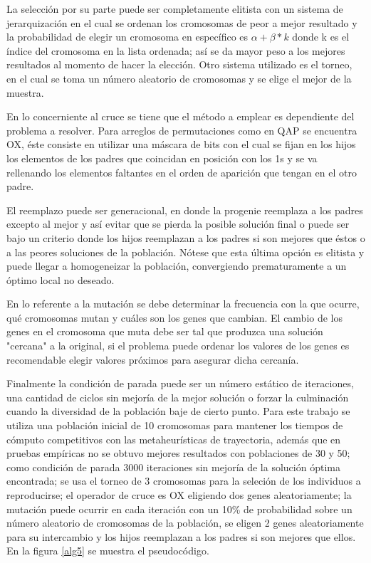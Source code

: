 \documentclass{ci5652}
\begin{document}
La selección por su parte puede ser completamente elitista con un sistema de jerarquización en el cual se ordenan los cromosomas de peor a mejor resultado y la probabilidad de elegir un cromosoma en específico es $\alpha+\beta*k$ donde k es el índice del cromosoma en la lista ordenada; así se da mayor peso a los mejores resultados al momento de hacer la elección. Otro sistema utilizado es el torneo, en el cual se toma un número aleatorio de cromosomas y se elige el mejor de la muestra.

En lo concerniente al cruce se tiene que el método a emplear es dependiente del problema a resolver. Para arreglos de permutaciones como en QAP se encuentra OX, éste consiste en utilizar una máscara de bits con el cual se fijan en los hijos los elementos de los padres que coincidan en posición con los 1s y se va rellenando los elementos faltantes en el orden de aparición que tengan en el otro padre.

El reemplazo puede ser generacional, en donde la progenie reemplaza a los padres excepto al mejor y así evitar que se pierda la posible solución final o puede ser bajo un criterio donde los hijos reemplazan a los padres si son mejores que éstos o a las peores soluciones de la población. Nótese que esta última opción es elitista y puede llegar a homogeneizar la población, convergiendo prematuramente a un óptimo local no deseado.

En lo referente a la mutación se debe determinar la frecuencia con la que ocurre, qué cromosomas mutan y cuáles son los genes que cambian. El cambio de los genes en el cromosoma que muta debe ser tal que produzca una solución "cercana" a la original, si el problema puede ordenar los valores de los genes es recomendable elegir valores próximos para asegurar dicha cercanía.

Finalmente la condición de parada puede ser un número estático de iteraciones, una cantidad de ciclos sin mejoría de la mejor solución o forzar la culminación cuando la diversidad de la población baje de cierto punto. Para este trabajo se utiliza una población inicial de 10 cromosomas para mantener los tiempos de cómputo competitivos con las metaheurísticas de trayectoria, además que en pruebas empíricas no se obtuvo mejores resultados con poblaciones de 30 y 50; como condición de parada 3000 iteraciones sin mejoría de la solución óptima encontrada; se usa el torneo de 3 cromosomas para la seleción de los individuos a reproducirse; el operador de cruce es OX eligiendo dos genes aleatoriamente; la mutación puede ocurrir en cada iteración con un 10\% de probabilidad sobre un número aleatorio de cromosomas de la población, se eligen 2 genes aleatoriamente para su intercambio y los hijos reemplazan a los padres si son mejores que ellos. En la figura  \ref{alg5} se muestra el pseudocódigo.
\end{document}
